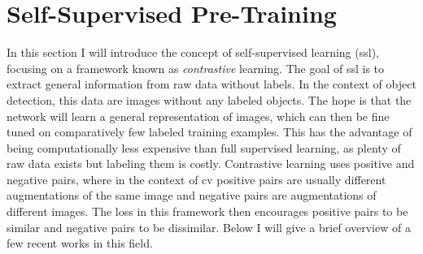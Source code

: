 \section{Self-Supervised Pre-Training}\label{sec:ssl}
In this section I will introduce the concept of self-supervised learning (\acrshort{ssl}), focusing on a framework known as \emph{contrastive} learning. The goal of \acrshort{ssl} is to extract general information from raw data without labels. In the context of object detection, this data are images without any labeled objects. The hope is that the network will learn a general representation of images, which can then be fine tuned on comparatively few labeled training examples. This has the advantage of being computationally less expensive than full supervised learning, as plenty of raw data exists but labeling them is costly. Contrastive learning uses positive and negative pairs, where in the context of \acrshort{cv} positive pairs are usually different augmentations of the same image and negative pairs are augmentations of different images. The loss in this framework then encourages positive pairs to be similar and negative pairs to be dissimilar. Below I will give a brief overview of a few recent works in this field.


